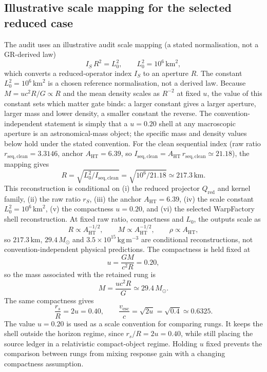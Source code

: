 \documentclass[11pt,a4paper]{article}
\begin{document}
\subsection{Illustrative scale mapping for the selected reduced case}

The audit uses an illustrative audit scale mapping (a stated normalisation, not a GR-derived law)
\[
I_{S}\,R^{2}=L_{0}^{2},\qquad L_{0}^{2}=10^{6}\,\mathrm{km}^{2},
\]
which converts a reduced-operator index $I_{S}$ to an aperture $R$. The constant $L_{0}^{2}=10^{6}\,\mathrm{km}^{2}$ is a chosen reference normalisation, not a derived law. Because $M=uc^{2}R/G\propto R$ and the mean density scales as $R^{-2}$ at fixed $u$, the value of this constant sets which matter gate binds: a larger constant gives a larger aperture, larger mass and lower density, a smaller constant the reverse. The convention-independent statement is simply that a $u=0.20$ shell at any macroscopic aperture is an astronomical-mass object; the specific mass and density values below hold under the stated convention.
For the clean sequential index (raw ratio $r_{\mathrm{seq,clean}}=3.3146$, anchor $A_{\mathrm{HT}}=6.39$, so $I_{\mathrm{seq,clean}}=A_{\mathrm{HT}}\,r_{\mathrm{seq,clean}}\simeq21.18$), the mapping gives
\[
R = \sqrt{L_{0}^{2}/I_{\mathrm{seq,clean}}} = \sqrt{10^{6}/21.18} \simeq 217.3\,\mathrm{km}.
\]
This reconstruction is conditional on (i) the reduced projector $Q_{\mathrm{red}}$ and kernel family, (ii) the raw ratio $r_{S}$, (iii) the anchor $A_{\mathrm{HT}}=6.39$, (iv) the scale constant $L_{0}^{2}=10^{6}\,\mathrm{km}^{2}$, (v) the compactness $u=0.20$, and (vi) the selected WarpFactory shell reconstruction. At fixed raw ratio, compactness and $L_{0}$, the outputs scale as
\[
R\propto A_{\mathrm{HT}}^{-1/2},\qquad M\propto A_{\mathrm{HT}}^{-1/2},\qquad \rho\propto A_{\mathrm{HT}},
\]
so $217.3\,\mathrm{km}$, $29.4\,M_{\odot}$ and $3.5\times10^{15}\,\mathrm{kg\,m^{-3}}$ are conditional reconstructions, not convention-independent physical predictions.
The compactness is held fixed at
\[
u=\frac{GM}{c^{2}R}=0.20,
\]
so the mass associated with the retained rung is
\[
M = \frac{u c^{2}R}{G} \simeq 29.4\,M_{\odot}.
\]
The same compactness gives
\[
\frac{r_{s}}{R}=2u=0.40,
\qquad
\frac{v_{\mathrm{esc}}}{c} = \sqrt{2u} = \sqrt{0.4} \simeq 0.6325.
\]
The value $u=0.20$ is used as a scale convention for comparing rungs. It keeps the shell outside the horizon regime, since $r_{s}/R=2u=0.40$, while still placing the source ledger in a relativistic compact-object regime. Holding $u$ fixed prevents the comparison between rungs from mixing response gain with a changing compactness assumption.
\end{document}
